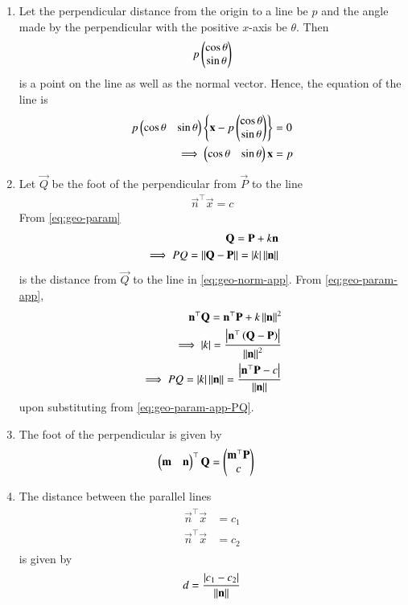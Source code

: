 \begin{enumerate}[label=\thesubsection.\arabic*.,ref=\thesubsection.\theenumi]
\item Let the perpendicular distance from the origin to a line be $p$ and the angle made by the perpendicular with the positive $x$-axis be $\theta$.
	Then 
\begin{align}
	p\begin{pmatrix}\cos \theta \\ \sin \theta\end{pmatrix}
\end{align}
is a point on the line as well as the normal vector.
Hence, the equation of the line is 
\begin{align}
	p\begin{pmatrix}\cos \theta & \sin \theta\end{pmatrix}
	\left\{\mathbf{x}-p\begin{pmatrix}\cos \theta \\ \sin \theta\end{pmatrix}\right\} &= 0
	\\
	\implies 
	\begin{pmatrix}\cos \theta & \sin \theta\end{pmatrix}
	\mathbf{x} &= p
\label{eq:chapters/11/10/2/8-final}
\end{align}
\item Let $\vec{Q}$ be the foot of the perpendicular from $\vec{P}$
	to the line
\begin{align}
			\label{eq:geo-norm-app}
    \vec{n}^{\top}  \vec{x} = c
\end{align}
From
			\eqref{eq:geo-param}
\begin{align}
			\label{eq:geo-param-app}
	\mathbf{Q} = \mathbf{P} + k\mathbf{n}
	\\
	\implies PQ = \left\lVert\mathbf{Q} - \mathbf{P}\right\rVert=\left\vert k\right\vert \left\lVert\mathbf{n}\right\rVert
			\label{eq:geo-param-app-PQ}
\end{align}
is the distance from $\vec{Q}$
to the line in 
			\eqref{eq:geo-norm-app}.
			From \eqref{eq:geo-param-app},
\begin{align}
	\mathbf{n}^{\top}  \mathbf{Q} = \mathbf{n}^{\top}  \mathbf{P} + k\left\lVert\mathbf{n}\right\rVert^2
	\\
	\implies \left\vert k\right\vert = 
	\frac{\left\vert\mathbf{n}^{\top}\left(\mathbf{Q} - \mathbf{P}\right)\right\vert}{\left\lVert\mathbf{n}\right\rVert^2}
			\label{eq:geo-param-app-k}
			\\
	\implies PQ =\left\vert k\right\vert  
		\left\lVert\mathbf{n}\right\rVert	=
	\frac{\left\vert\mathbf{n}^{\top}\mathbf{P} - c\right\vert}{\left\lVert\mathbf{n}\right\rVert}
			\label{eq:PQ-final}
\end{align}
upon substituting from 
			\eqref{eq:geo-param-app-PQ}.
\item The foot of the perpendicular is given by
\begin{align}
	\label{eq:11/10/3/4/foot_of_perpendicular}
	\begin{pmatrix}\mathbf{m} & \mathbf{n}\end{pmatrix}^\top\mathbf{Q} &= 
	   \begin{pmatrix}
              \mathbf{m}^\top\mathbf{P}\\
	      c
	      \end{pmatrix}
\end{align}
\item The distance between the parallel lines 
\begin{align}
	\label{eq:parallel_lines}
	\begin{split}
		\vec{n}^{\top}\vec{x} &= c_1
		\\
		\vec{n}^{\top}\vec{x} &= c_2
	\end{split}
\end{align}
is given by 
\begin{align}
	\label{eq:dist_lines_2d}
	d = \frac{\left\vert   c_1-c_2 \right\vert}{\left\lVert\mathbf{n}\right\rVert}	
\end{align}
\end{enumerate}
